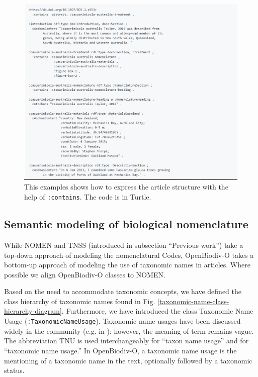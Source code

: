 \begin{figure}[h!]
  \centering
  \includegraphics[width=\textwidth]{Figures/example-article-structure}
  \decoRule
  \caption[Example article structure.]{This examples shows how to express the article structure with the help of {\tt :contains}. The code is in Turtle.}
  \label{example-article-structure}
\end{figure}


\subsection{Semantic modeling of biological nomenclature}

While NOMEN and TNSS (introduced in subsection ``Previous work'') take a top-down approach of modeling the nomenclatural Codes, \mbox{OpenBiodiv-O} takes a bottom-up approach of modeling the use of taxonomic names in articles. Where possible we align \mbox{OpenBiodiv-O} classes to NOMEN.

Based on the need to accommodate taxonomic concepts, we have defined the class hierarchy of taxonomic names found in Fig. \ref{taxonomic-name-class-hierarchy-diagram}. Furthermore, we have introduced the class Taxonomic Name Usage ({\tt :TaxonomicNameUsage}). Taxonomic name usages have been discussed widely in the community (e.g. in \cite{pyle_taxonomic_2016}); however, the meaning of term remains vague. The abbreviation TNU is used interchangeably for ``taxon name usage'' and for ``taxonomic name usage.'' In \mbox{OpenBiodiv-O}, a taxonomic name usage is the mentioning of a taxonomic name in the text, optionally followed by a taxonomic status.

